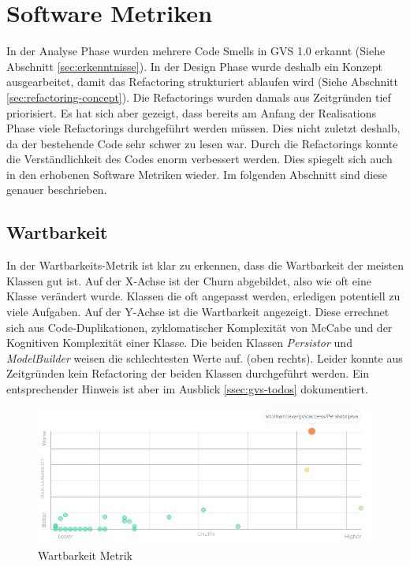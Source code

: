\documentclass[11pt,a4paper,english,oneside]{book}
\numberwithin{equation}{chapter}
\begin{document}
	\section{Software Metriken} \label{sec:metrics-2}
	In der Analyse Phase wurden mehrere Code Smells in GVS 1.0 erkannt (Siehe Abschnitt \ref{sec:erkenntnisse}). In der Design Phase wurde deshalb ein Konzept ausgearbeitet, damit das Refactoring strukturiert ablaufen wird (Siehe Abschnitt \ref{sec:refactoring-concept}). Die Refactorings wurden damals aus Zeitgründen tief priorisiert. Es hat sich aber gezeigt, dass bereits am Anfang der Realisations Phase viele Refactorings durchgeführt werden müssen. Dies nicht zuletzt deshalb, da der bestehende Code sehr schwer zu lesen war. Durch die Refactorings konnte die Verständlichkeit des Codes enorm verbessert werden. Dies spiegelt sich auch in den erhobenen Software Metriken wieder. Im folgenden Abschnitt sind diese genauer beschrieben.
	
	\subsection{Wartbarkeit}
	In der Wartbarkeits-Metrik \cite{metric-maintainability} ist klar zu erkennen, dass die Wartbarkeit der meisten Klassen gut ist. Auf der X-Achse ist der Churn \cite{metric-churn} abgebildet, also wie oft eine Klasse verändert wurde. Klassen die oft angepasst werden, erledigen potentiell zu viele Aufgaben. Auf der Y-Achse ist die Wartbarkeit angezeigt. Diese errechnet sich aus Code-Duplikationen, zyklomatischer Komplexität von McCabe \cite{mccabe} und der Kognitiven Komplexität \cite{metric-cognitive-complexity} einer Klasse. Die beiden Klassen \textit{Persistor} und \textit{ModelBuilder} weisen die schlechtesten Werte auf. (oben rechts). Leider konnte aus Zeitgründen kein Refactoring der beiden Klassen durchgeführt werden. Ein entsprechender Hinweis ist aber im Ausblick \ref{ssec:gvs-todos} dokumentiert.
	
	\clearpage
	
	\begin{figure}[h!]
		\centering
		\includegraphics[width=\linewidth]{assets/images/metrics/maintainability}
		\caption{Wartbarkeit Metrik}
		\label{fig:metric-maintainability}
	\end{figure}
	
\end{document}
